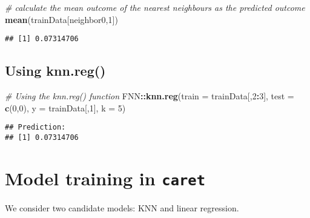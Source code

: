 \documentclass[
]{article}
\newenvironment{Shaded}{\begin{snugshade}}{\end{snugshade}}
\newcommand{\AttributeTok}[1]{\textcolor[rgb]{0.13,0.29,0.53}{#1}}
\newcommand{\CommentTok}[1]{\textcolor[rgb]{0.56,0.35,0.01}{\textit{#1}}}
\newcommand{\DecValTok}[1]{\textcolor[rgb]{0.00,0.00,0.81}{#1}}
\newcommand{\FunctionTok}[1]{\textcolor[rgb]{0.13,0.29,0.53}{\textbf{#1}}}
\newcommand{\NormalTok}[1]{#1}
\newcommand{\SpecialCharTok}[1]{\textcolor[rgb]{0.81,0.36,0.00}{\textbf{#1}}}
\begin{document}
\begin{Shaded}
\begin{Highlighting}[]
\CommentTok{\# calculate the mean outcome of the nearest neighbours as the predicted outcome}
\FunctionTok{mean}\NormalTok{(trainData[neighbor0,}\DecValTok{1}\NormalTok{])}
\end{Highlighting}
\end{Shaded}

\begin{verbatim}
## [1] 0.07314706
\end{verbatim}

\subsection{Using knn.reg()}\label{using-knn.reg}

\begin{Shaded}
\begin{Highlighting}[]
\CommentTok{\# Using the knn.reg() function }
\NormalTok{FNN}\SpecialCharTok{::}\FunctionTok{knn.reg}\NormalTok{(}\AttributeTok{train =}\NormalTok{ trainData[,}\DecValTok{2}\SpecialCharTok{:}\DecValTok{3}\NormalTok{], }
             \AttributeTok{test =} \FunctionTok{c}\NormalTok{(}\DecValTok{0}\NormalTok{,}\DecValTok{0}\NormalTok{), }
             \AttributeTok{y =}\NormalTok{ trainData[,}\DecValTok{1}\NormalTok{], }
             \AttributeTok{k =} \DecValTok{5}\NormalTok{)}
\end{Highlighting}
\end{Shaded}

\begin{verbatim}
## Prediction:
## [1] 0.07314706
\end{verbatim}

\section{\texorpdfstring{Model training in
\texttt{caret}}{Model training in caret}}\label{model-training-in-caret}

We consider two candidate models: KNN and linear regression.
\end{document}
